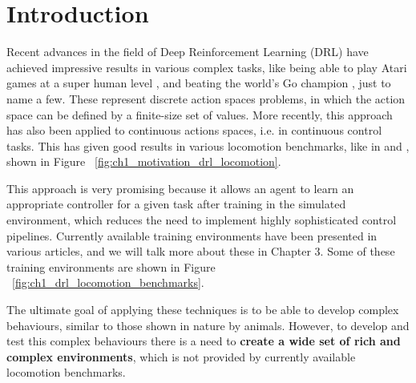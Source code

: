 \chapter{Introduction}
\label{ch:intro}



Recent advances in the field of Deep Reinforcement Learning (DRL) have achieved impressive
results in various complex tasks, like being able to play Atari games at a super human level \citep{DQNAtari}, 
and beating the world's Go champion \citep{AlphaGo}, just to name a few. These represent discrete 
action spaces problems, in which the action space can be defined by a finite-size set of values. 
More recently, this approach has also been applied to continuous actions spaces, i.e. in continuous 
control tasks. This has given good results in various locomotion benchmarks, like in 
\citeauthor{DeepmindEmergenceLocomotion} and \citeauthor{DeepMimic}, shown in Figure ~\ref{fig:ch1_motivation_drl_locomotion}.

\figDrlLocomotionMotivation

This approach is very promising because it allows an agent to learn an appropriate controller for a given task after training in
the simulated environment, which reduces the need to implement highly sophisticated control pipelines. Currently available 
training environments have been presented in various articles, and we will talk more about these in Chapter 3.
Some of these training environments are shown in Figure ~\ref{fig:ch1_drl_locomotion_benchmarks}.

The ultimate goal of applying these techniques is to be able to develop complex behaviours, similar
to those shown in nature by animals. However, to develop and test this complex behaviours there is a need to \textbf{create
a wide set of rich and complex environments}, which is not provided by currently available locomotion benchmarks.

\figDrlBenchmarks

